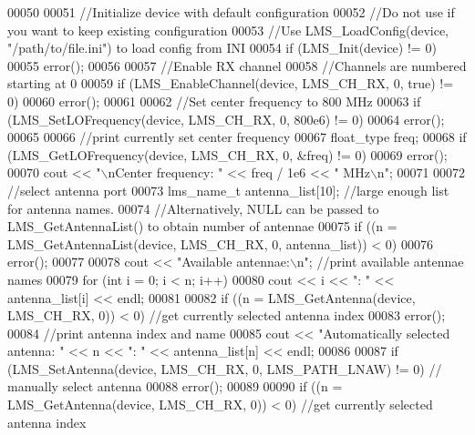\begin{DoxyCode}
00050 
00051     \textcolor{comment}{//Initialize device with default configuration}
00052     \textcolor{comment}{//Do not use if you want to keep existing configuration}
00053     \textcolor{comment}{//Use LMS\_LoadConfig(device, "/path/to/file.ini") to load config from INI}
00054     \textcolor{keywordflow}{if} (LMS_Init(device) != 0)
00055         error();
00056 
00057     \textcolor{comment}{//Enable RX channel}
00058     \textcolor{comment}{//Channels are numbered starting at 0}
00059     \textcolor{keywordflow}{if} (LMS_EnableChannel(device, LMS_CH_RX, 0, \textcolor{keyword}{true}) != 0)
00060         error();
00061 
00062     \textcolor{comment}{//Set center frequency to 800 MHz}
00063     \textcolor{keywordflow}{if} (LMS_SetLOFrequency(device, LMS_CH_RX, 0, 800e6) != 0)
00064         error();
00065 
00066     \textcolor{comment}{//print currently set center frequency}
00067     float_type freq;
00068     \textcolor{keywordflow}{if} (LMS_GetLOFrequency(device, LMS_CH_RX, 0, &freq) != 0)
00069         error();
00070     cout << \textcolor{stringliteral}{"\(\backslash\)nCenter frequency: "} << freq / 1e6 << \textcolor{stringliteral}{" MHz\(\backslash\)n"};
00071 
00072     \textcolor{comment}{//select antenna port}
00073     lms_name_t antenna\_list[10];    \textcolor{comment}{//large enough list for antenna names.}
00074                                     \textcolor{comment}{//Alternatively, NULL can be passed to LMS\_GetAntennaList() to obtain
       number of antennae}
00075     \textcolor{keywordflow}{if} ((n = LMS_GetAntennaList(device, LMS_CH_RX, 0, antenna\_list)) < 0)
00076         error();
00077 
00078     cout << \textcolor{stringliteral}{"Available antennae:\(\backslash\)n"};            \textcolor{comment}{//print available antennae names}
00079     \textcolor{keywordflow}{for} (\textcolor{keywordtype}{int} i = 0; i < n; i++)
00080         cout << i << \textcolor{stringliteral}{": "} << antenna\_list[i] << endl;
00081 
00082     \textcolor{keywordflow}{if} ((n = LMS_GetAntenna(device, LMS_CH_RX, 0)) < 0) \textcolor{comment}{//get currently selected antenna index}
00083         error();
00084     \textcolor{comment}{//print antenna index and name}
00085     cout << \textcolor{stringliteral}{"Automatically selected antenna: "} << n << \textcolor{stringliteral}{": "} << antenna\_list[n] << endl;
00086 
00087     \textcolor{keywordflow}{if} (LMS_SetAntenna(device, LMS_CH_RX, 0, LMS_PATH_LNAW) != 0) \textcolor{comment}{// manually select antenna}
00088         error();
00089 
00090     \textcolor{keywordflow}{if} ((n = LMS_GetAntenna(device, LMS_CH_RX, 0)) < 0) \textcolor{comment}{//get currently selected antenna index}

\end{DoxyCode}
